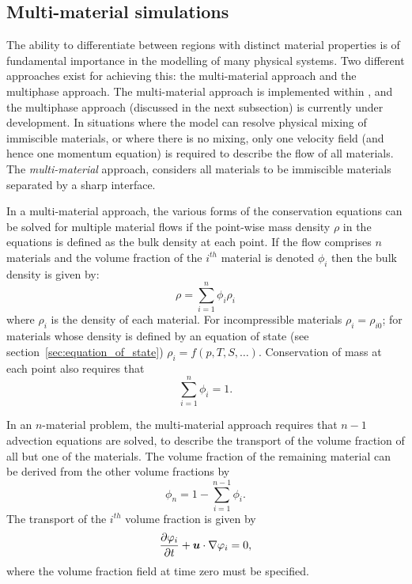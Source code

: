\subsection{Multi-material simulations}
The ability to differentiate between regions with distinct material properties is of fundamental importance in the modelling of many physical systems. Two different approaches exist for achieving this: the multi-material approach and the multiphase approach. The multi-material approach is implemented within \fluidity, and the multiphase approach (discussed in the next subsection) is currently under development.
In situations where the model can resolve physical mixing of immiscible materials, or where there is no mixing, only one velocity field (and hence one momentum equation) is required to describe the flow of all materials. The \emph{multi-material} approach, considers all materials to be immiscible materials separated by a sharp interface.

In a multi-material approach, the various forms of the conservation equations can be solved for multiple material flows if the point-wise mass density $\rho$ in the equations is defined as the bulk density at each point.  If the flow comprises $n$ materials and the volume fraction of the $i^{th}$ material is denoted $\phi_i$ then the bulk density is given by:
\begin{equation}
\rho = \sum_{i=1}^n \phi_i\rho_i
\end{equation}
where $\rho_i$ is the density of each material.  For incompressible materials $\rho_i = \rho_{i0}$; for materials whose density is defined by an equation of state (see section~\ref{sec:equation_of_state}) $\rho_i = f(p,T,S,\ldots)$.  Conservation of mass at each point also requires that
\begin{equation}
\sum_{i=1}^n \phi_{i} = 1.
\end{equation}

In an $n$-material problem, the multi-material approach requires that $n-1$ advection equations are solved, to describe the transport of the volume fraction of all but one of the materials.  The volume fraction of the remaining material can be derived from the other volume fractions by
\begin{equation}\label{diagnosticvolfrac}
\phi_{n} = 1 - \sum_{i=1}^{n-1}\phi_{i}. 
\end{equation}
The transport of the $i^{th}$ volume fraction is given by  
\begin{equation}
\frac{\partial\varphi_i}{\partial t} + {\mbox{\boldmath$u$}}\cdot\nabla\varphi_i = 0,
\end{equation}
where the volume fraction field at time zero must be specified.

